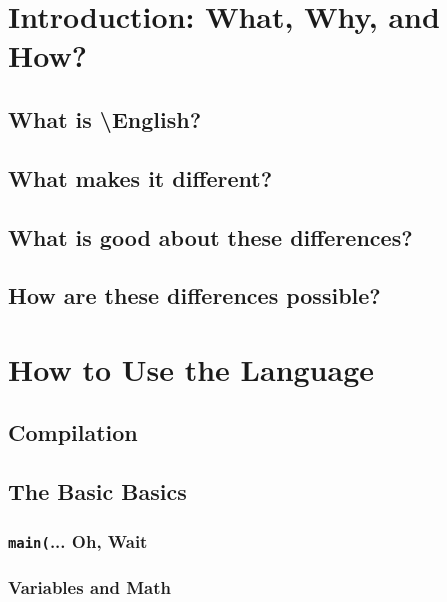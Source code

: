 \documentclass{article}
\newcommand{\name}{\textbackslash{}English}
\begin{document}
\tableofcontents
\newpage

\section{Introduction: What, Why, and How?}

\subsection{What is \name{}?}

\subsection{What makes it different?}

\subsection{What is good about these differences?}

\subsection{How are these differences possible?}

\section{How to Use the Language}
\subsection{Compilation}

\subsection{The Basic Basics}
\subsubsection{\texttt{main(}... Oh, Wait}

\subsubsection{Variables and Math}


\end{document}
